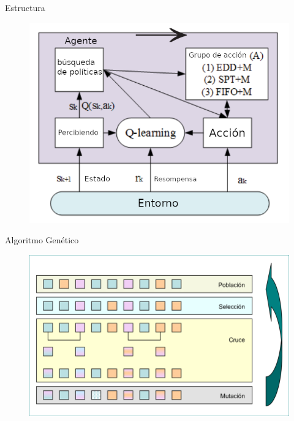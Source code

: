 \documentclass{beamer}
\begin{document}
\begin{frame}{Estructura}
	\begin{figure}
		\centering
		\includegraphics[scale=0.4]{estructura}
	\end{figure} 
\end{frame}

\begin{frame}{Algoritmo Genético \citep{batista2009}}
	\begin{figure}
		\centering
		\includegraphics[scale = 0.35]{algoritmogenetico}
	\end{figure}
	
\end{frame}
\end{document}
